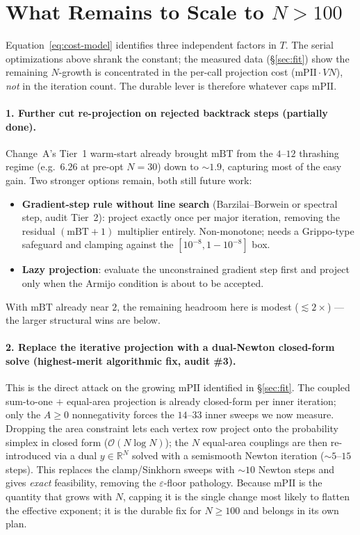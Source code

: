 \documentclass[11pt,a4paper]{article}
\begin{document}
\section{What Remains to Scale to $N > 100$}
\label{sec:improvements}

Equation~\eqref{eq:cost-model} identifies three independent factors in $T$.
The serial optimizations above shrank the constant; the measured data
(\S\ref{sec:fit}) show the remaining $N$-growth is concentrated in the per-call
projection cost ($\mathrm{mPII}\cdot VN$), \emph{not} in the iteration count.
The durable lever is therefore whatever caps $\mathrm{mPII}$.

\paragraph{1. Further cut re-projection on rejected backtrack steps
(partially done).}
Change~A's Tier~1 warm-start already brought $\mathrm{mBT}$ from the
$4$--$12$ thrashing regime (e.g.\ $6.26$ at pre-opt $N=30$) down to $\sim\!1.9$,
capturing most of the easy gain.  Two stronger options remain, both still
future work:
\begin{itemize}
  \item \textbf{Gradient-step rule without line search} (Barzilai--Borwein or
    spectral step, audit Tier~2): project exactly once per major iteration,
    removing the residual $(\mathrm{mBT}+1)$ multiplier entirely.  Non-monotone;
    needs a Grippo-type safeguard and clamping against the $[10^{-8},1-10^{-8}]$
    box.
  \item \textbf{Lazy projection}: evaluate the unconstrained gradient step
    first and project only when the Armijo condition is about to be accepted.
\end{itemize}
With $\mathrm{mBT}$ already near $2$, the remaining headroom here is modest
($\lesssim\!2\times$) --- the larger structural wins are below.

\paragraph{2. Replace the iterative projection with a dual-Newton closed-form
solve (highest-merit algorithmic fix, audit \#3).}
This is the direct attack on the growing $\mathrm{mPII}$ identified in
\S\ref{sec:fit}.  The coupled sum-to-one $+$ equal-area projection is already
closed-form per inner iteration; only the $A \ge 0$ nonnegativity forces the
$14$--$33$ inner sweeps we now measure.  Dropping the area constraint lets each
vertex row project onto the probability simplex in closed form
($\mathcal{O}(N\log N)$); the $N$ equal-area couplings are then re-introduced
via a dual $y\in\mathbb{R}^N$ solved with a semismooth Newton iteration
($\sim\!5$--$15$ steps).  This replaces the clamp/Sinkhorn sweeps with
$\sim\!10$ Newton steps and gives \emph{exact} feasibility, removing the
$\varepsilon$-floor pathology.  Because $\mathrm{mPII}$ is the quantity that
grows with $N$, capping it is the single change most likely to flatten the
effective exponent; it is the durable fix for $N \ge 100$ and belongs in its
own plan.
\end{document}
